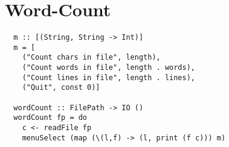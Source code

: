 \documentclass[a4paper]{article}
\begin{document}
\section{Word-Count}
\begin{lstlisting}
  m :: [(String, String -> Int)]
  m = [
    ("Count chars in file", length),
    ("Count words in file", length . words),
    ("Count lines in file", length . lines),
    ("Quit", const 0)]

  wordCount :: FilePath -> IO ()
  wordCount fp = do
    c <- readFile fp
    menuSelect (map (\(l,f) -> (l, print (f c))) m)
\end{lstlisting}
\end{document}
